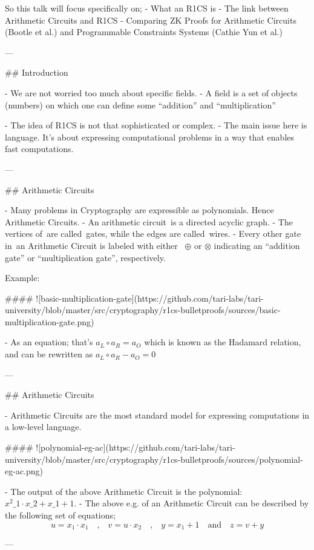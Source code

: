 So this talk will focus specifically on; 
- What an R1CS is 
- The link between Arithmetic Circuits and R1CS 
- Comparing ZK Proofs for Arithmetic Circuits (Bootle et al.) and Programmable Constraints Systems (Cathie Yun et al.)

--- 

## Introduction

- We are not worried too much about specific fields. 
   - A field is a set of objects (numbers) on which one can define some “addition” and “multiplication” 

   -  The idea of R1CS is not that sophisticated or complex. 
   -  The main issue here is language. It’s about expressing computational problems in a way that enables fast computations.


---

## Arithmetic Circuits

-  Many problems in Cryptography are expressible as polynomials. Hence Arithmetic Circuits. 
-  An arithmetic circuit is a directed acyclic graph. 
- The vertices of are called gates, while the edges are called wires. 
- Every other gate in an Arithmetic Circuit is labeled with either  $\oplus$  or  $\otimes$  indicating an “addition gate” or “multiplication gate”, respectively.

Example:

#### ![basic-multiplication-gate](https://github.com/tari-labs/tari-university/blob/master/src/cryptography/r1cs-bulletproofs/sources/basic-multiplication-gate.png)

- As an equation; that’s  
$ a_L \circ a_R = a_O  $ 
which is known as the Hadamard relation, and can be rewritten as
$a_L \circ a_R - a_O = 0 $

---

## Arithmetic Circuits

- Arithmetic Circuits are the most standard model for expressing computations in a low-level language.

#### ![polynomial-eg-ac](https://github.com/tari-labs/tari-university/blob/master/src/cryptography/r1cs-bulletproofs/sources/polynomial-eg-ac.png)

- The output of the above Arithmetic Circuit is the polynomial:   $x^2\_1 \cdot x\_2 + x\_1 + 1 $. 
- The above e.g. of an Arithmetic Circuit can be described by the following set of equations; 
$$
u = x_1 \cdot x_1 \quad \text{,} \quad v = u \cdot x_2 \quad \text{,} \quad y = x_1 + 1 \quad \text{and} \quad z = v + y
$$

---

